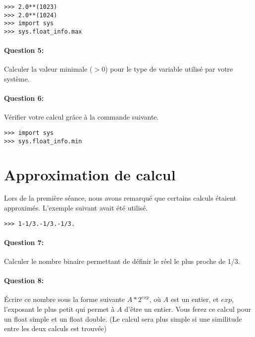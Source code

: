 \begin{GrayBox}%
\begin{verbatim}
>>> 2.0**(1023)
>>> 2.0**(1024)
>>> import sys
>>> sys.float_info.max
\end{verbatim}
\end{GrayBox}

\paragraph{Question 5:} Calculer la valeur minimale ($>0$) pour le type de variable utilisé par votre système.

\paragraph{Question 6:} Vérifier votre calcul grâce à la commande suivante.

\begin{GrayBox}%
\begin{verbatim}
>>> import sys
>>> sys.float_info.min
\end{verbatim}
\end{GrayBox}

\section{Approximation de calcul}

Lors de la première séance, nous avons remarqué que certains calculs étaient approximés. L'exemple suivant avait été utilisé.

\begin{GrayBox}%
\begin{verbatim}
>>> 1-1/3.-1/3.-1/3.
\end{verbatim}
\end{GrayBox}

\paragraph{Question 7:} Calculer le nombre binaire permettant de définir le réel le plus proche de 1/3.

\paragraph{Question 8:} Écrire ce nombre sous la forme suivante $A*2^{exp}$, où $A$ est un entier, et $exp$, l'exposant le plus petit qui permet à $A$ d'être un entier. Vous ferez ce calcul pour un float simple et un float double. (Le calcul sera plus simple si une similitude entre les deux calculs est trouvée)

